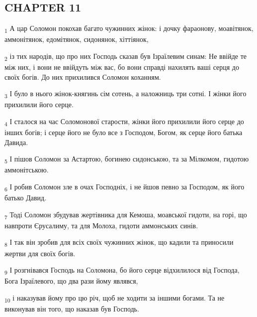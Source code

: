 \subsection{CHAPTER 11}
\begin{tcolorbox}
\textsubscript{1} А цар Соломон покохав багато чужинних жінок: і дочку фараонову, моавітянок, аммонітянок, едомітянок, сидонянок, хіттіянок,
\end{tcolorbox}
\begin{tcolorbox}
\textsubscript{2} із тих народів, що про них Господь сказав був Ізраїлевим синам: Не ввійде те між них, і вони не ввійдуть між вас, бо вони справді нахилять ваші серця до своїх богів. До них прихилився Соломон коханням.
\end{tcolorbox}
\begin{tcolorbox}
\textsubscript{3} І було в нього жінок-княгинь сім сотень, а наложниць три сотні. І жінки його прихилили його серце.
\end{tcolorbox}
\begin{tcolorbox}
\textsubscript{4} І сталося на час Соломонової старости, жінки його прихилили його серце до інших богів; і серце його не було все з Господом, Богом, як серце його батька Давида.
\end{tcolorbox}
\begin{tcolorbox}
\textsubscript{5} І пішов Соломон за Астартою, богинею сидонською, та за Мілкомом, гидотою аммонітською.
\end{tcolorbox}
\begin{tcolorbox}
\textsubscript{6} І робив Соломон зле в очах Господніх, і не йшов певно за Господом, як його батько Давид.
\end{tcolorbox}
\begin{tcolorbox}
\textsubscript{7} Тоді Соломон збудував жертівника для Кемоша, моавської гидоти, на горі, що навпроти Єрусалиму, та для Молоха, гидоти аммонських синів.
\end{tcolorbox}
\begin{tcolorbox}
\textsubscript{8} І так він зробив для всіх своїх чужинних жінок, що кадили та приносили жертви для своїх богів.
\end{tcolorbox}
\begin{tcolorbox}
\textsubscript{9} І розгнівався Господь на Соломона, бо його серце відхилилося від Господа, Бога Ізраїлевого, що два рази йому являвся,
\end{tcolorbox}
\begin{tcolorbox}
\textsubscript{10} і наказував йому про цю річ, щоб не ходити за іншими богами. Та не виконував він того, що наказав був Господь.
\end{tcolorbox}
